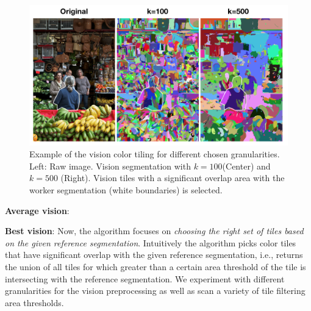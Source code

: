 \begin{figure}
\vspace{-30pt}
\centering
\includegraphics[width=0.9\linewidth]{plots/vision_tiles.png}
\caption{Example of the vision color tiling for different chosen granularities. Left: Raw image. Vision segmentation with $k=100$(Center) and $k=500$ (Right). Vision tiles with a significant overlap area with the worker segmentation (white boundaries) is selected.}
\label{vision_example}
\end{figure}

\par \noindent\textbf{Average vision}: 
\par \noindent\textbf{Best vision}: 
Now, the algorithm focuses on {\em choosing the right set of tiles based on the given reference segmentation}. 
Intuitively the algorithm picks color tiles that have significant overlap with the given reference segmentation, i.e., returns the union of all tiles for which greater than a certain area threshold of the tile is intersecting with the reference segmentation. We experiment with different granularities for the vision preprocessing as well as scan a variety of tile filtering area thresholds. 